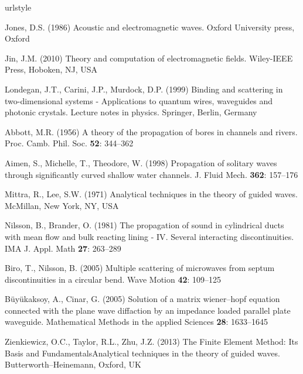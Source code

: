 \documentclass{svjour3}
\begin{document}
% 
% 
\begin{thebibliography}{10}
\providecommand{\url}[1]{{#1}}
\providecommand{\urlprefix}{URL }
\expandafter\ifx\csname urlstyle\endcsname\relax
  \providecommand{\doi}[1]{DOI~\discretionary{}{}{}#1}\else
  \providecommand{\doi}{DOI~\discretionary{}{}{}\begingroup
  \urlstyle{rm}\Url}\fi

Jones, D.S. (1986) Acoustic and electromagnetic waves.
\newblock Oxford {U}niversity press, Oxford

Jin, J.M. (2010) Theory and computation of electromagnetic fields.
\newblock Wiley-IEEE Press, Hoboken, NJ, USA

Londegan, J.T., Carini, J.P., Murdock, D.P. (1999) Binding and scattering in
  two-dimensional systems - Applications to quantum wires, waveguides and
  photonic crystals.
\newblock Lecture notes in physics. Springer, Berlin, Germany

Abbott, M.R. (1956) A theory of the propagation of bores in channels and
  rivers.
\newblock Proc. Camb. Phil. Soc. \textbf{52}: 344--362

Aimen, S., Michelle, T., Theodore, W. (1998) Propagation of solitary waves
  through significantly curved shallow water channels.
\newblock J. Fluid Mech. \textbf{362}: 157--176

Mittra, R., Lee, S.W. (1971) Analytical techniques in the theory of guided
  waves.
\newblock McMillan, New York, NY, USA

Nilsson, B., Brander, O. (1981) The propagation of sound in cylindrical ducts
  with mean flow and bulk reacting lining - {IV}. {S}everal interacting
  discontinuities.
\newblock IMA J. Appl. Math \textbf{27}: 263--289

Biro, T., Nilsson, B. (2005) Multiple scattering of microwaves from septum
  discontinuities in a circular bend.
\newblock Wave Motion \textbf{42}: 109--125

B\"uy\"ukaksoy, A., Cinar, G. (2005) Solution of a matrix wiener–hopf
  equation connected with the plane wave diffaction by an impedance loaded
  parallel plate waveguide.
\newblock Mathematical Methods in the applied Sciences \textbf{28}: 1633--1645

Zienkiewicz, O.C., Taylor, R.L., Zhu, J.Z. (2013) The Finite Element Method:
  Its Basis and FundamentalsAnalytical techniques in the theory of guided
  waves.
\newblock Butterworth--Heinemann, Oxford, UK


\end{thebibliography}
\end{document}
